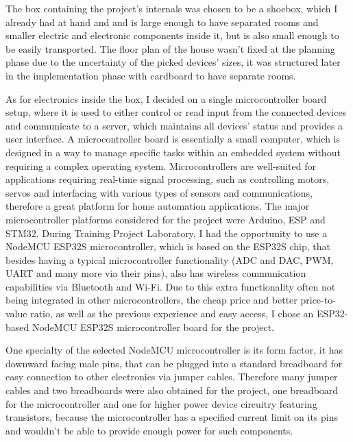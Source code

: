 The box containing the project's internals was chosen to be a shoebox, which I already had at hand and and is large enough to have separated rooms and smaller electric and electronic components inside it, but is also small enough to be easily transported. The floor plan of the house wasn't fixed at the planning phase due to the uncertainty of the picked devices' sizes, it was structured later in the implementation phase with cardboard to have separate rooms.

As for electronics inside the box, I decided on a single microcontroller board setup, where it is used to either control or read input from the connected devices and communicate to a server, which maintains all devices' status and provides a user interface. A microcontroller board is essentially a small computer, which is designed in a way to manage specific tasks within an embedded system without requiring a complex operating system. \cite{IBMmicrocontroller} Microcontrollers are well-suited for applications requiring real-time signal processing, such as controlling motors, servos and interfacing with various types of sensors and communications, therefore a great platform for home automation applications. The major microcontroller platforms considered for the project were Arduino, ESP and STM32. During Training Project Laboratory, I had the opportunity to use a NodeMCU ESP32S microcontroller, which is based on the ESP32S chip, that besides having a typical microcontroller functionality (ADC and DAC, PWM, UART and many more via their pins), also has wireless communication capabilities via Bluetooth and Wi-Fi. Due to this extra functionality often not being integrated in other microcontrollers, the cheap price and better price-to-value ratio, as well as the previous experience and easy access, I chose an ESP32-based NodeMCU ESP32S microcontroller board for the project. \cite{ESPvArduino} \cite{ESPvSTM}

One specialty of the selected NodeMCU microcontroller is its form factor, it has downward facing male pins, that can be plugged into a standard breadboard for easy connection to other electronics via jumper cables. Therefore many jumper cables and two breadboards were also obtained for the project, one breadboard for the microcontroller and one for higher power device circuitry featuring transistors, because the microcontroller has a specified current limit on its pins and wouldn't be able to provide enough power for such components.

